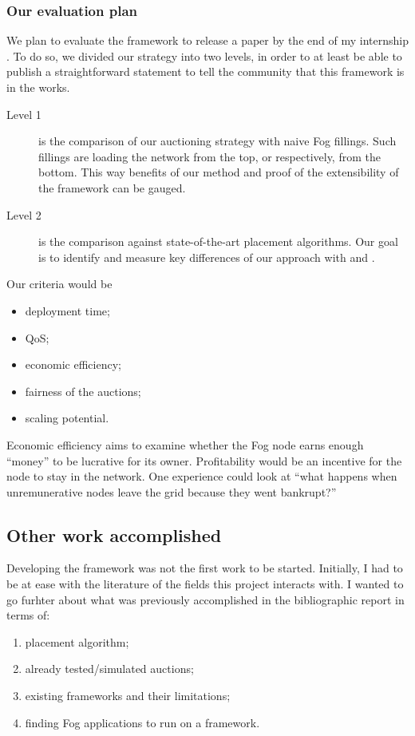 \documentclass[11pt]{sdm}
\begin{document}
\subsubsection{Our evaluation plan}

We plan to evaluate the framework to release a paper by the end of my internship . To do so, we divided our strategy into two levels, in order to at least be able to publish a straightforward statement to tell the community that this framework is in the works.

\begin{description}
	\item[Level 1]{is the comparison of our auctioning strategy with naive Fog fillings. Such fillings are loading the network from the top, or respectively, from the bottom. This way benefits of our method and proof of the extensibility of the framework can be gauged.}
	\item[Level 2]{is the comparison against state-of-the-art placement algorithms. Our goal is to identify and measure key differences of our approach with \cite{bermbach_auctionwhisk_2022} and \cite{tasiopoulos_fogspot_2021}.}
\end{description}

Our criteria would be
\begin{itemize}
	\item deployment time;
	\item \gls{QoS};
	\item economic efficiency;
	\item fairness of the auctions;
	\item scaling potential.
\end{itemize}

Economic efficiency aims to examine whether the Fog node earns enough “money” to be lucrative for its owner. Profitability would be an incentive for the node to stay in the network. One experience could look at “what happens when unremunerative nodes leave the grid because they went bankrupt?”

\subsection{Other work accomplished}

Developing the framework was not the first work to be started. Initially, I had to be at ease with the literature of the fields this project interacts with. I wanted to go furhter about what was previously accomplished in the bibliographic report in terms of:
\begin{enumerate}
	\item placement algorithm;\label{enumerate:placement}
	\item already tested/simulated auctions;\label{enumerate:alreadytested}
	\item existing frameworks and their limitations;\label{enumerate:frameworklimitations}
	\item finding Fog applications to run on a framework.\label{enumerate:fogapplications}
\end{enumerate}
\end{document}
